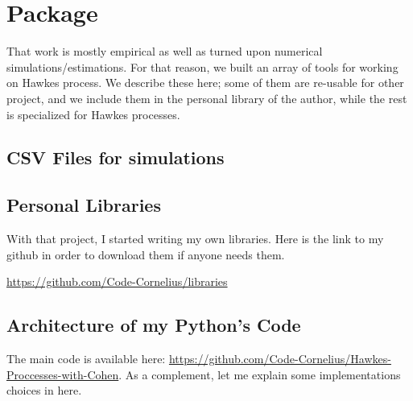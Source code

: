 \chapter{Package}
That work is mostly empirical as well as turned upon numerical simulations/estimations. For that reason, we built an array of tools for working on Hawkes process. We describe these here; some of them are re-usable for other project, and we include them in the personal library of the author, while the rest is specialized for Hawkes processes.

\section{CSV Files for simulations}
\label{section:files_csv}


\section{Personal Libraries}
\label{personal_lib}
With that project, I started writing my own libraries. Here is the link to my github in order to download them if anyone needs them. 

\href{https://github.com/Code-Cornelius/libraries}{https://github.com/Code-Cornelius/libraries}


\section{Architecture of my Python's Code}
\label{csv-files}
The main code is available here: 
\href{https://github.com/Code-Cornelius/Hawkes-Proccesses-with-Cohen}{https://github.com/Code-Cornelius/Hawkes-Proccesses-with-Cohen}. As a complement, let me explain some implementations choices in here.

